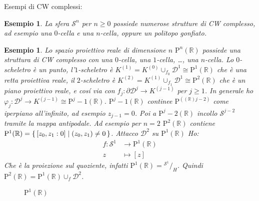 \documentclass[10pt, twoside=false, x11names]{scrbook}
\newtheorem{example}[theorem]{Esempio}
\newcommand{\Pjr}[1]{\mathrm{P}^#1 (\mathbb{R})}
\newcommand{\Sph}[1][]{\mathcal{S}^#1}
\newcommand{\Disk}[1][]{\mathcal{D}^#1}
\newcommand*\quot[2]{{^{\textstyle #1}\big/_{\textstyle #2}}}
\let\phi\varphi
\begin{document}
Esempi di CW complessi:
\begin{example}
  La sfera $ \Sph{n} $ per $ n \geq 0 $ possiede numerose strutture di CW complesso,
  ad esempio una $ 0 $-cella e una $ n $-cella, oppure un politopo gonfiato.
\end{example}
\begin{example}
  Lo spazio proiettivo reale di dimensione $ n $ $ \Pjr{n} $ possiede una struttura
  di CW complesso con una $ 0 $-cella, una $ 1 $-cella, \dots, una $ n $-cella. Lo
  $ 0 $-scheletro è un punto, l'$ 1 $-scheletro è $ K^{(1)} = K^{(0)} \cup_{f_0} \Disk{1} \cong \Pjr{1} $
  che è una retta proiettiva reale, il $ 2 $-scheletro è $ K^{(2)} = K^{(1)} \cup_{f_1} \Disk{1} \cong \Pjr{2} $
  che è un piano proiettivo reale, e cosí via con $ f_j \colon \partial \Disk{j} \to K^{(j-1)} $ per $ j \geq 1 $.
  In generale ho $ \phi_j \colon \Disk{j} \to K^{(j-1)} \cong \Pjr{j-1} $. $ \Pjr{j-1} $ continee
  $ \Pjr(j-2) $ come iperpiano all'infinito, ad esempio $ z_{j-1} = 0 $. Poi a $ \Pjr{j-2} $ incollo
  $ \Sph{j-2} $ tramite la mappa antipodale. Ad esempio per $ n = 2 $ $ \Pjr{2} $ contiene
  $ \Pjr{1} = \set{ [z_0, z_1 : 0] | (z_0, z_1) \not = 0 } $. Attacco $ \Disk{2} $ su $ \Pjr{1} $
  Ho:
  \begin{align*}
    f \colon \Sph{1} & \to \Pjr{1} \\
    z & \mapsto [z]
  \end{align*}
  Che è la proiezione sul quoziente, infatti $ \Pjr{1} = \quot{\Sph{1}}{H} $. Quindi
  $ \Pjr{2} = \Pjr{1} \cup_f \Disk{2} $.
  \begin{figure}[htbp]
    \centering
    \caption{$ \Pjr{1} $}
    \label{fig:lez10:projective}
  \end{figure}
\end{example}
\end{document}
